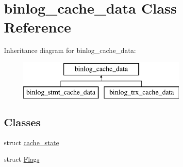 \hypertarget{classbinlog__cache__data}{}\section{binlog\+\_\+cache\+\_\+data Class Reference}
\label{classbinlog__cache__data}
Inheritance diagram for binlog\+\_\+cache\+\_\+data\+:\begin{figure}[H]
\begin{center}
\leavevmode
\includegraphics[height=2.000000cm]{classbinlog__cache__data}
\end{center}
\end{figure}
\subsection*{Classes}
\begin{DoxyCompactItemize}
\item 
struct \mbox{\hyperlink{structbinlog__cache__data_1_1cache__state}{cache\+\_\+state}}
\item 
struct \mbox{\hyperlink{structbinlog__cache__data_1_1Flags}{Flags}}
\end{DoxyCompactItemize}
